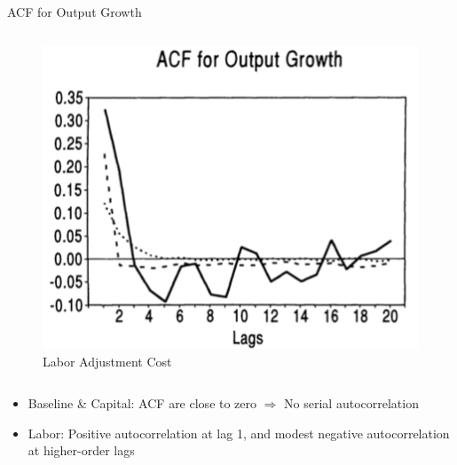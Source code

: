 \documentclass[10pt]{beamer}
\begin{document}
\begin{frame}{ACF for Output Growth}
\begin{columns}[T,onlytextwidth]
		      				\begin{figure}
		      					\centering
		      					\includegraphics[width=\linewidth]{figures/L_ACF.png}
		      					\caption{Labor Adjustment Cost}
		      				\end{figure}
		      			\end{columns}
		      			
		      			\begin{itemize}
		      				\item Baseline \& Capital: ACF are close to zero $\Rightarrow$ No serial autocorrelation
		      				\item Labor: Positive autocorrelation at lag 1, and modest negative autocorrelation at higher-order lags
		      			\end{itemize}
		      			
		      		\end{frame}
		      		
\end{document}
